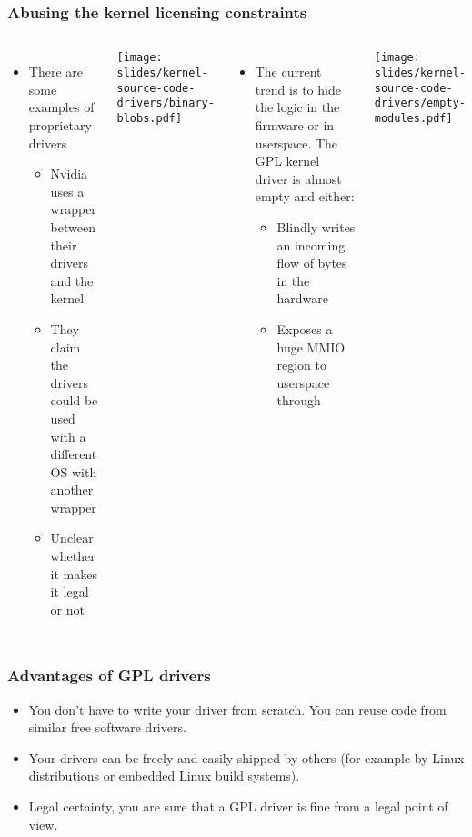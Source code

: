 \begin{frame}
  \frametitle{Abusing the kernel licensing constraints}
  \begin{columns}
    \begin{itemize}
    \item There are some examples of proprietary drivers
      \begin{itemize}
      \item Nvidia uses a wrapper between their drivers and the kernel
      \item They claim the drivers could be used with a different OS
        with another wrapper
      \item Unclear whether it makes it legal or not
      \end{itemize}
    \end{itemize}
    \begin{center}
    \texttt{[image: slides/kernel-source-code-drivers/binary-blobs.pdf]}
    \end{center}
    \begin{itemize}
    \item The current trend is to hide the logic in the firmware or in
      userspace. The GPL kernel driver is almost empty and either:
      \begin{itemize}
      \item Blindly writes an incoming flow of bytes in the hardware
      \item Exposes a huge MMIO region to userspace through 
      \end{itemize}
    \end{itemize}
    \begin{center}
    \texttt{[image: slides/kernel-source-code-drivers/empty-modules.pdf]}
    \end{center}
  \end{columns}
\end{frame}

\begin{frame}
  \frametitle{Advantages of GPL drivers}
  \begin{itemize}
  \item You don't have to write your driver from scratch. You can
    reuse code from similar free software drivers.
  \item Your drivers can be freely and easily shipped by others (for
    example by Linux distributions or embedded Linux build systems).
  \item Legal certainty, you are sure that a GPL driver is fine from a
    legal point of view.
  \end{itemize}
\end{frame}

